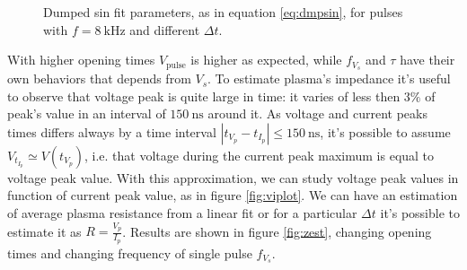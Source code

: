 \begin{figure}
 \centering
 
 \hfill
 \caption{Dumped sin fit parameters, as in equation \ref{eq:dmpsin}, for pulses with $f=\SI{8}{\kilo\hertz}$ and different $\Delta t$.}
 \label{fig:parexp}
\end{figure}

With higher opening times $ V_{\text{pulse}}$ is higher as expected, while $f_{V_{s}}$ and $\tau$ have their own behaviors that depends from $V_s$.
To estimate plasma's impedance it's useful to observe that voltage peak is quite large in time: it varies of less then $3\%$ of peak's value in an interval of $\SI{150}{\nano\second}$ around it. As voltage and current peaks times differs always by a time interval $|t_{V_p} - t_{I_p}| \leq \SI{150}{\nano\second}$, it's possible to assume $V_{t_{I_p}} \simeq V(t_{V_p})$, i.e. that voltage during the current peak maximum is equal to voltage peak value. With this approximation, we can study voltage peak values in function of current peak value, as in figure \ref{fig:viplot}. We can have an estimation of average plasma resistance from a linear fit or for a particular $\Delta t$ it's possible to estimate it as $R = \frac{V_{p}}{I_{p}}$. Results are shown in figure \ref{fig:zest}, changing opening times and changing frequency of single pulse $f_{V_{s}}$.

